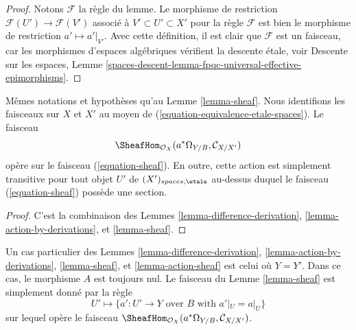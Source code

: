 \begin{proof}
Notons $\mathcal{F}$ la règle du lemme.
Le morphisme de restriction $\mathcal{F}(U') \to \mathcal{F}(V')$ associé à
$V' \subset U' \subset X'$
pour la règle $\mathcal{F}$ est bien le morphisme de restriction $a' \mapsto a'|_{V'}$.
Avec cette définition, il est clair que $\mathcal{F}$ est un
faisceau, car les morphismes d'espaces algébriques vérifient la descente étale, voir
Descente sur les espaces,
Lemme \ref{spaces-descent-lemma-fpqc-universal-effective-epimorphisms}.
\end{proof}

\begin{lemma}
\label{lemma-action-sheaf}
Mêmes notations et hypothèses qu'au Lemme \ref{lemma-sheaf}.
Nous identifions les faisceaux sur $X$ et $X'$ au moyen de
(\ref{equation-equivalence-etale-spaces}).
Le faisceau
$$
\SheafHom_{\mathcal{O}_X}(a^*\Omega_{Y/B}, \mathcal{C}_{X/X'})
$$
opère sur le faisceau (\ref{equation-sheaf}). En outre, cette action
est simplement transitive pour tout objet $U'$ de $(X')_{spaces, \etale}$
au-dessus duquel le faisceau (\ref{equation-sheaf}) possède une section.
\end{lemma}

\begin{proof}
C'est la combinaison des
Lemmes \ref{lemma-difference-derivation},
\ref{lemma-action-by-derivations},
et \ref{lemma-sheaf}.
\end{proof}

\begin{remark}
\label{remark-special-case}
Un cas particulier des
Lemmes \ref{lemma-difference-derivation},
\ref{lemma-action-by-derivations},
\ref{lemma-sheaf}, et
\ref{lemma-action-sheaf}
est celui où $Y = Y'$. Dans ce cas, le morphisme $A$ est toujours nul.
Le faisceau du
Lemme \ref{lemma-sheaf}
est simplement donné par la règle
$$
U' \mapsto
\{a' : U' \to Y\text{ over }B\text{ with } a'|_U = a|_U\}
$$
sur lequel opère le faisceau
$\SheafHom_{\mathcal{O}_X}(a^*\Omega_{Y/B}, \mathcal{C}_{X/X'})$.
\end{remark}

